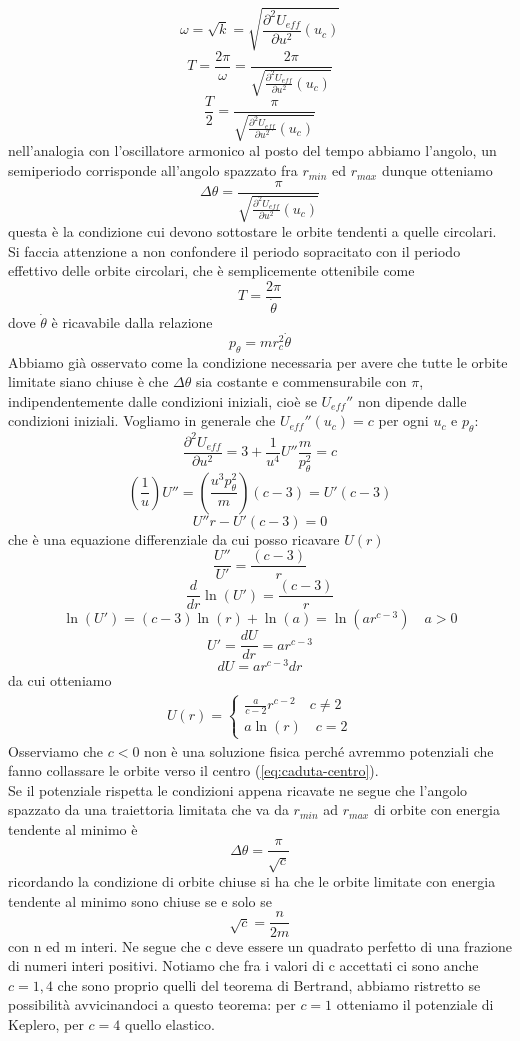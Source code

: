 \documentclass[
10pt, %
a4paper, %
oneside, %
headinclude,footinclude, %
BCOR5mm, %
]{scrartcl}
\begin{document}
\[\omega = \sqrt{k} = \sqrt{\frac{\partial^2 U_{eff}}{\partial u^2}(u_c)}\] 
\[T = \frac{2\pi}{\omega} = \frac{2\pi}{\sqrt{\frac{\partial^2 U_{eff}}{\partial u^2}(u_c)}}\]
\[\frac{T}{2} = \frac{\pi}{\sqrt{\frac{\partial^2 U_{eff}}{\partial u^2}(u_c)}}\]
nell'analogia con l'oscillatore armonico al posto del tempo abbiamo l'angolo, un semiperiodo corrisponde all'angolo spazzato fra \(r_{min}\) ed \(r_{max}\) dunque otteniamo
\[\Delta\theta = \frac{\pi}{\sqrt{\frac{\partial^2 U_{eff}}{\partial u^2}(u_c)}}\]
questa è la condizione cui devono sottostare le orbite tendenti a quelle circolari.\\
Si faccia attenzione a non confondere il periodo sopracitato con il periodo effettivo delle orbite circolari, che è semplicemente ottenibile come
\[T = \frac{2\pi}{\dot{\theta}}\]
dove $\dot{\theta}$ è ricavabile dalla relazione 
\[p_\theta = mr_c^2\dot{\theta}\]
Abbiamo già osservato come la condizione necessaria per avere che tutte le orbite limitate siano chiuse è che $\Delta\theta$ sia costante e commensurabile con $\pi$, indipendentemente dalle condizioni iniziali, cioè se \(U_{eff}''\) non dipende dalle condizioni iniziali. Vogliamo in generale che \(U_{eff}''(u_c) = c\) per ogni \(u_c\) e \(p_\theta\):
\[\frac{\partial^2 U_{eff}}{\partial u^2}= 3+\frac{1}{u^4}U''\frac{m}{p_\theta^2} = c\]
\[\left(\frac{1}{u}\right)U'' = \left(\frac{u^3p_\theta^2}{m}\right)(c-3) = U'(c-3)\]
\[U''r-U'(c-3)=0\]
che è una equazione differenziale da cui posso ricavare \(U(r)\)
\[\frac{U''}{U'}=\frac{(c-3)}{r}\]
\[\frac{d}{dr}\ln(U') = \frac{(c-3)}{r}\]
\[\ln(U') = (c-3)\ln(r)+\ln(a) = \ln(ar^{c-3}) \quad a>0 \]
\[U' =\frac{dU}{dr} =  a r^{c-3}\]
\[dU = ar^{c-3}dr\]
da cui otteniamo 
\begin{align*}
	U(r) = 
	\begin{cases}
		\frac{a}{c-2}r^{c-2}\quad c\neq 2\\
		a\ln(r)\quad c = 2
	\end{cases}
\end{align*}
Osserviamo che \(c<0\) non è una soluzione fisica perché avremmo potenziali che fanno collassare le orbite verso il centro (\ref{eq:caduta-centro}).\\
Se il potenziale rispetta le condizioni appena ricavate ne segue che l'angolo spazzato da una traiettoria limitata che va da \(r_{min}\) ad \(r_{max}\) di orbite con energia tendente al minimo è
\[\Delta\theta = \frac{\pi}{\sqrt{c}}\]
ricordando la condizione di orbite chiuse si ha che le orbite limitate con energia tendente al minimo sono chiuse se e solo se
\[\sqrt{c} = \frac{n}{2m}\]
con n ed m interi. Ne segue che c deve essere un quadrato perfetto di una frazione di numeri interi positivi. Notiamo che fra i valori di c accettati ci sono anche \(c = 1,  4\) che sono proprio quelli del teorema di Bertrand, abbiamo ristretto se possibilità avvicinandoci a questo teorema: per \(c = 1\) otteniamo il potenziale di Keplero, per \(c = 4\) quello elastico.
\end{document}

